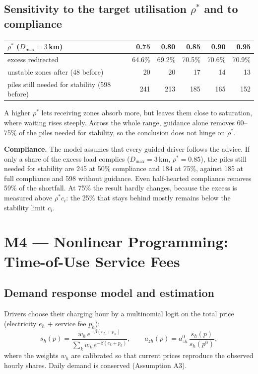 \documentclass[11pt,a4paper]{article}
\begin{document}
\subsection{\texorpdfstring{Sensitivity to the target utilisation $\rho^*$ and to compliance}{Sensitivity to the target utilisation and to compliance}}
\begin{center}\small
\begin{tabular}{@{}lrrrrr@{}}\toprule
$\rho^*$ ($D_{\max} = 3$\,km) & 0.75 & 0.80 & 0.85 & 0.90 & 0.95\\\midrule
excess redirected & 64.6\% & 69.2\% & 70.5\% & 70.6\% & 70.9\%\\
unstable zones after (48 before) & 20 & 20 & 17 & 14 & 13\\
piles still needed for stability (598 before) & 241 & 213 & 185 & 165 & 152\\\bottomrule
\end{tabular}\end{center}
A higher $\rho^*$ lets receiving zones absorb more, but leaves them close to saturation, where waiting rises steeply. Across the whole range, guidance alone removes 60--75\% of the piles needed for stability, so the conclusion does not hinge on $\rho^*$.

\textbf{Compliance.} The model assumes that every guided driver follows the advice. If only a share of the excess load complies ($D_{\max} = 3$\,km, $\rho^* = 0.85$), the piles still needed for stability are 245 at 50\% compliance and 184 at 75\%, against 185 at full compliance and 598 without guidance. Even half-hearted compliance removes 59\% of the shortfall. At 75\% the result hardly changes, because the excess is measured above $\rho^* c_i$: the 25\% that stays behind mostly remains below the stability limit $c_i$.

\section{M4 --- Nonlinear Programming: Time-of-Use Service Fees}\label{sec:m4}
\subsection{Demand response model and estimation}
Drivers choose their charging hour by a multinomial logit on the total price (electricity $e_h$ + service fee $p_h$):
\[
s_h(p) = \frac{w_h\,e^{-\beta(e_h+p_h)}}{\sum_k w_k\,e^{-\beta(e_k+p_k)}},\qquad a_{zh}(p) = a_{zh}^0\,\frac{s_h(p)}{s_h(p^0)},
\]
where the weights $w_h$ are calibrated so that current prices reproduce the observed hourly shares. Daily demand is conserved (Assumption A3).
\end{document}

